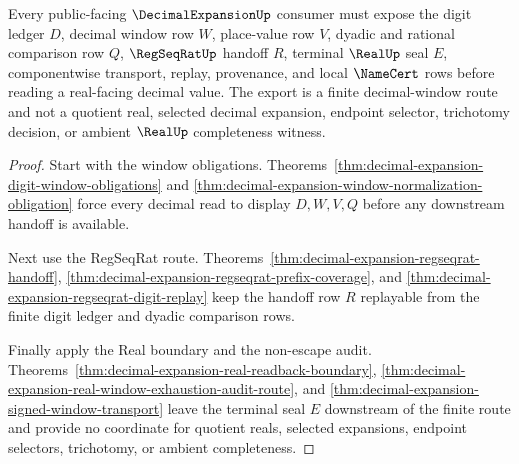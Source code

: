 \begin{theorem}
\label{thm:decimal-expansion-public-window-export}
Every public-facing $\DecimalExpansionUp$ consumer must expose the digit ledger $D$, decimal window row $W$, place-value row $V$, dyadic and rational comparison row $Q$, $\RegSeqRatUp$ handoff $R$, terminal $\RealUp$ seal $E$, componentwise transport, replay, provenance, and local $\NameCert$ rows before reading a real-facing decimal value. The export is a finite decimal-window route and not a quotient real, selected decimal expansion, endpoint selector, trichotomy decision, or ambient $\RealUp$ completeness witness.
\end{theorem}
\begin{proof}
Start with the window obligations. Theorems~\ref{thm:decimal-expansion-digit-window-obligations} and \ref{thm:decimal-expansion-window-normalization-obligation} force every decimal read to display $D,W,V,Q$ before any downstream handoff is available.

Next use the RegSeqRat route. Theorems~\ref{thm:decimal-expansion-regseqrat-handoff}, \ref{thm:decimal-expansion-regseqrat-prefix-coverage}, and \ref{thm:decimal-expansion-regseqrat-digit-replay} keep the handoff row $R$ replayable from the finite digit ledger and dyadic comparison rows.

Finally apply the Real boundary and the non-escape audit. Theorems~\ref{thm:decimal-expansion-real-readback-boundary}, \ref{thm:decimal-expansion-real-window-exhaustion-audit-route}, and \ref{thm:decimal-expansion-signed-window-transport} leave the terminal seal $E$ downstream of the finite route and provide no coordinate for quotient reals, selected expansions, endpoint selectors, trichotomy, or ambient completeness.
\end{proof}


